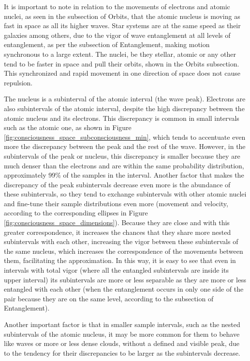 It is important to note in relation to the movements of electrons and atomic nuclei, as seen in the subsection of Orbits, that the atomic nucleus is moving as fast in space as all its higher waves. Star systems are at the same speed as their galaxies among others, due to the vigor of wave entanglement at all levels of entanglement, as per the subsection of Entanglement, making motion synchronous to a large extent. The nuclei, be they stellar, atomic or any other tend to be faster in space and pull their orbits, shown in the Orbits subsection. This synchronized and rapid movement in one direction of space does not cause repulsion.

The nucleus is a subinterval of the atomic interval (the wave peak). Electrons are also subintervals of the atomic interval, despite the high discrepancy between the atomic nucleus and its electrons. This discrepancy is common in small intervals such as the atomic one, as shown in Figure \ref{fig:consciousness_space_subconsciousness_min}, which tends to accentuate even more the discrepancy between the peak and the rest of the wave. However, in the subintervals of the peak or nucleus, this discrepancy is smaller because they are much denser than the electrons and are within the same probability distribution, approximately 99\% of the samples in the interval. Another factor that makes the discrepancy of the peak subintervals decrease even more is the abundance of these subintervals, so they tend to exchange subintervals with other atomic nuclei and fine-tune their sample distributions even more (movement and velocity, according to the corresponding ellipses in Figure \ref {fig:consciousness_space_dimensions}). Because they are close and with this greater correspondence, it increases the chances that they share more nested subintervals with each other, increasing the vigor between these subintervals of the same nucleus, which increases the correspondence of the movements between them, facilitating the approximation. In this way, it is easy to see that even in intervals with total vigor (where all the entangled subintervals are inside its upper interval) its subintervals are more or less separable as they are more or less entangled with each other (when the entanglement occurs in only one side of the pair because they are on the same level, according to the subsection of Entanglement).

Another important factor is that in smaller sample intervals, such as the nested subintervals of the atomic nucleus, it may be more common for them to behave like waves or more or less dense clouds, without a defined and visible peak, due to the tendency for their discrepancies to be larger as the subintervals decrease.

